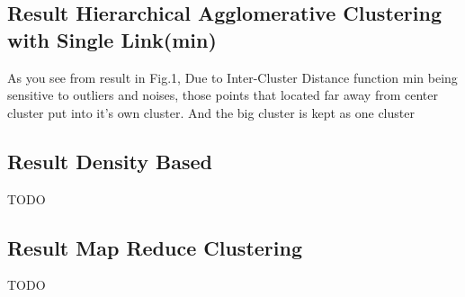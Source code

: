\documentclass[fleqn]{llncs}
\begin{document}
\subsection{Result Hierarchical Agglomerative Clustering with Single Link(min)}
As you see from result in Fig.1, Due to Inter-Cluster Distance function min being sensitive to outliers and noises, those points that located far away from center cluster put into it's own cluster. And the big cluster is kept as one cluster
\subsection{Result Density Based}
TODO
\subsection{Result Map Reduce Clustering}
TODO
\end{document}
